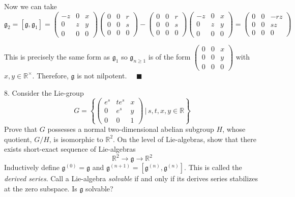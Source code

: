 \documentclass[12pt]{article}
\newcommand{\R}{\mathbb{R}}
\newcommand{\lra}{\longrightarrow}
\newcommand{\g}{\mathfrak{g}}
\newcommand{\qed}{\quad \blacksquare}
\begin{document}
        Now we can take 
        \[\g_2 = [\g, \g_1] = \begin{pmatrix}
            -z & 0 & x\\
            0 & z & y\\
            0 & 0 & 0
        \end{pmatrix}\begin{pmatrix}
            0 & 0 & r\\
            0 & 0 & s\\
            0 & 0 & 0
        \end{pmatrix} - \begin{pmatrix}
            0 & 0 & r\\
            0 & 0 & s\\
            0 & 0 & 0
        \end{pmatrix} \begin{pmatrix}
            -z & 0 & x\\
            0 & z & y\\
            0 & 0 & 0
        \end{pmatrix} = \begin{pmatrix}
            0 & 0 & -rz\\
            0 & 0 & sz\\
            0 & 0 & 0
        \end{pmatrix}\] 

        This is precisely the same form as $\g_1$ so $\g_{n\geq 1}$ is of the form $\begin{pmatrix}
            0 & 0 & x\\
            0 & 0 & y\\
            0 & 0 & 0
        \end{pmatrix}$ with $x, y \in \R^{\times}$. Therefore, $\g$ is not nilpotent. $\qed$
    \color{black}


\pagebreak

8.  Consider the Lie-group
\[
G = \left\{\left(\begin{array}{cccc}
e^{s} & te^{s} & x\\
0 & e^{s}   & y\\
0 & 0 & 1
\end{array}\right) \, \bigg| \, s,t,x,y \in \R\right\}
\]
Prove that $G$ possesses a normal two-dimensional abelian subgroup $H$, whose quotient, $G/H$, is isomorphic to $\R^{2}$.  On the level of Lie-algebras, show that there exists short-exact sequence of Lie-algebras
\[
\R^{2} \lra \mathfrak{g} \lra \R^{2}
\]
Inductively define $\g^{(0)} = \g$ and $\g^{(n+1)} = [\g^{(n)},\g^{(n)}]$.  This is called the \emph{derived series}. Call a Lie-algebra \emph{solvable} if and only if its derives series stabilizes at the zero subspace.  Is $\mathfrak{g}$ solvable?  
\end{document}
